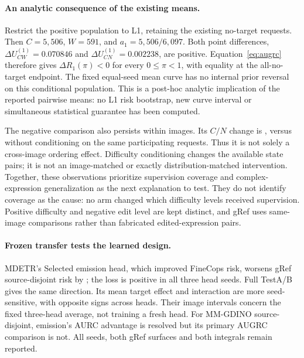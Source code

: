 \documentclass[10pt,twocolumn,letterpaper]{article}
\begin{document}
\paragraph{An analytic consequence of the existing means.}
Restrict the positive population to L1, retaining the existing no-target
requests. Then $C=5{,}506$, $W=591$, and $a_1=5{,}506/6{,}097$.
Both point differences, $\Delta U_{CW}^{(1)}=0.070846$ and
$\Delta U_{CN}^{(1)}=0.002238$, are positive. Equation~\ref{eq:augrc}
therefore gives $\Delta R_1(\pi)<0$ for every $0\leq\pi<1$, with
equality at the all-no-target endpoint. The fixed equal-seed mean curve
has no internal prior reversal on this conditional population.
This is a post-hoc analytic implication of the reported pairwise means:
no L1 risk bootstrap, new curve interval or simultaneous statistical
guarantee has been computed.

The negative comparison also persists within images. Its $C/N$ change
is \SameImageCN{}, versus \ComparableCN{} without conditioning on
the same participating requests. Thus it is not solely a cross-image
ordering effect. Difficulty conditioning changes the available state
pairs; it is not an image-matched or exactly distribution-matched
intervention. Together, these observations prioritize supervision coverage
and complex-expression generalization as the next explanation to test.
They do not identify coverage as the cause: no arm changed which difficulty
levels received supervision. Positive difficulty and negative edit level
are kept distinct, and gRef uses same-image comparisons rather than
fabricated edited-expression pairs.


\paragraph{Frozen transfer tests the learned design.}
MDETR's Selected emission head, which improved FineCops risk, worsens
gRef source-disjoint risk by \MDTransferReadout{}; the loss is positive
in all three head seeds. Full TestA/B gives the same direction.
Its mean target effect and interaction are more seed-sensitive, with
opposite signs across heads. Their image intervals concern the fixed
three-head average, not training a fresh head. For MM-GDINO source-disjoint,
emission's AURC advantage is resolved but its primary AUGRC comparison
is not. All seeds, both gRef surfaces and both integrals remain reported.
\end{document}

